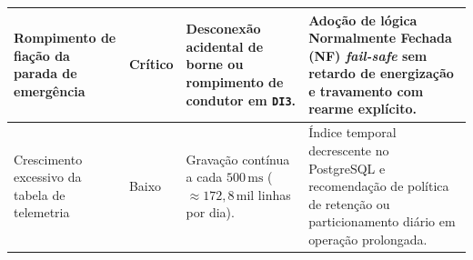 \begin{quadro}[htb]
\begin{tabularx}{\textwidth}{|p{2.6cm}|p{1.3cm}|L|L|}
    \hline
    Rompimento de fiação da parada de emergência & Crítico & Desconexão acidental de borne ou rompimento de condutor em \texttt{DI3}. & Adoção de lógica Normalmente Fechada (NF) \textit{fail-safe} sem retardo de energização e travamento com rearme explícito. \\
    \hline
    Crescimento excessivo da tabela de telemetria & Baixo & Gravação contínua a cada $500\,\text{ms}$ ($\approx 172{,}8\,\text{mil}$ linhas por dia). & Índice temporal decrescente no PostgreSQL e recomendação de política de retenção ou particionamento diário em operação prolongada. \\
    \hline
  \end{tabularx}
\end{quadro}
